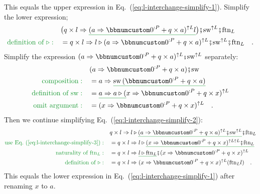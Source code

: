 This equals the upper expression in Eq.~(\ref{eq:l-interchange-simplify-1}).
Simplify the lower expression;
\begin{align}
 & \big(q\times l\Rightarrow\gunderline{(a\Rightarrow\bbnum 0^{:P}+q\times a)^{\uparrow L}l}\big)\bef\text{sw}^{\uparrow L}\bef\text{ftn}_{L}\nonumber \\
{\color{greenunder}\text{definition of }\triangleright:}\quad & =q\times l\Rightarrow l\triangleright(a\Rightarrow\bbnum 0^{:P}+q\times a)^{\uparrow L}\bef\text{sw}^{\uparrow L}\bef\text{ftn}_{L}\quad.\label{eq:l-interchange-simplify-2}
\end{align}
Simplify the expression $(a\Rightarrow\bbnum 0^{:P}+q\times a)^{\uparrow L}\bef\text{sw}^{\uparrow L}$
separately:
\begin{align}
 & (a\Rightarrow\bbnum 0^{:P}+q\times a)\bef\text{sw}\nonumber \\
{\color{greenunder}\text{composition}:}\quad & =a\Rightarrow\gunderline{\text{sw}\,(\bbnum 0^{:P}+q\times a)}\nonumber \\
{\color{greenunder}\text{definition of }\text{sw}:}\quad & =\gunderline{a\Rightarrow a\triangleright(}x\Rightarrow\bbnum 0^{:P}+q\times x)^{\uparrow L}\nonumber \\
{\color{greenunder}\text{omit argument}:}\quad & =(x\Rightarrow\bbnum 0^{:P}+q\times x)^{\uparrow L}\quad.\label{eq:l-interchange-simplify-3}
\end{align}
Then we continue simplifying Eq.~(\ref{eq:l-interchange-simplify-2}):
\begin{align*}
 & q\times l\Rightarrow l\triangleright\gunderline{(a\Rightarrow\bbnum 0^{:P}+q\times a)^{\uparrow L}\bef\text{sw}^{\uparrow L}}\bef\text{ftn}_{L}\\
{\color{greenunder}\text{use Eq.~(\ref{eq:l-interchange-simplify-3})}:}\quad & =q\times l\Rightarrow l\triangleright\gunderline{(x\Rightarrow\bbnum 0^{:P}+q\times x)^{\uparrow L\uparrow L}\bef\text{ftn}_{L}}\\
{\color{greenunder}\text{naturality of }\text{ftn}_{L}:}\quad & =q\times l\Rightarrow\gunderline{l\triangleright\text{ftn}_{L}}\bef(x\Rightarrow\bbnum 0^{:P}+q\times x)^{\uparrow L}\\
{\color{greenunder}\text{definition of }\triangleright:}\quad & =q\times l\Rightarrow(x\Rightarrow\bbnum 0^{:P}+q\times x)^{\uparrow L}(\text{ftn}_{L}l)\quad.
\end{align*}
This equals the lower expression in Eq.~(\ref{eq:l-interchange-simplify-1})
after renaming $x$ to $a$.

